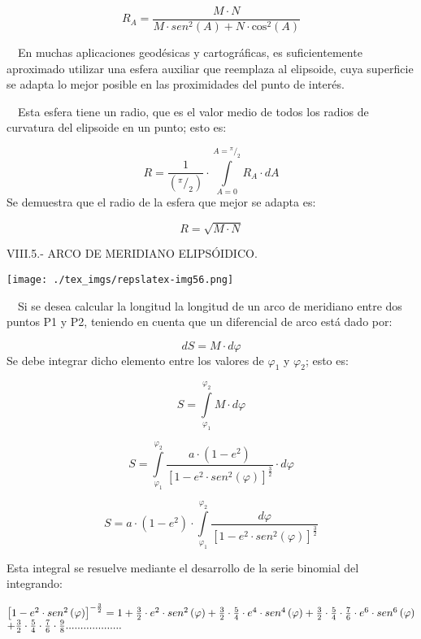 \documentclass[]{article}
\begin{document}
\[{R_{{A}}=\frac{M\cdot N}{M\cdot sen^{{2}}\left(A\right)+N\cdot \text{cos}^{{2}}\left(A\right)}}\]

~~En muchas aplicaciones geodésicas y cartográficas, es suficientemente
aproximado utilizar una esfera auxiliar que reemplaza al elipsoide, cuya
superficie se adapta lo mejor posible en las proximidades del punto de
interés.

~~Esta esfera tiene un radio, que es el valor medio de todos los radios
de curvatura del elipsoide en un punto; esto es:

\[{R=\frac{1}{\left({}^{\pi }/_{2}\right)}\cdot \overset{{A={}^{\pi }/_{2}}}{\underset{{A=0}}{\int }}{R_{{A}}\cdot dA}}\]
Se demuestra que el radio de la esfera que mejor se adapta es:

\[{R=\sqrt{M\cdot N}}\]

VIII.5.- ARCO DE MERIDIANO ELIPSÓIDICO.

\texttt{[image: ./tex\_imgs/repslatex-img56.png]}

~~Si se desea calcular la longitud la longitud de un arco de meridiano
entre dos puntos P1 y P2, teniendo en cuenta que un diferencial de arco
está dado por:

\[{dS=M\cdot d\varphi }\] Se debe integrar dicho elemento entre los
valores de \({\varphi _{{1}}}\) y \({\varphi _{{2}}}\); esto es:

\[{S=\overset{\varphi _{{2}}}{\underset{{\varphi _{{1}}}}{\int }}{M\cdot
d\varphi }}\]

\[{S=\overset{\varphi _{{2}}}{\underset{{\varphi _{{1}}}}{\int}}{\frac{a\cdot \left(1-e^{{2}}\right)}{\left[1-e^{{2}}\cdot sen^{{2}}\left(\varphi \right)\right]^{{\frac{3}{2}}}}\cdot d\varphi }}\]

\[{S=a\cdot \left(1-e^{{2}}\right)\cdot \overset{\varphi _{{2}}}{\underset{{\varphi _{{1}}}}{\int }}{\frac{d\varphi}{\left[1-e^{{2}}\cdot sen^{{2}}\left(\varphi \right)\right]^{{\frac{3}{2}}}}}}\]

Esta integral se resuelve mediante el desarrollo de la serie binomial
del integrando:

\[\begin{matrix}{\left[1-e^{{2}}\cdot sen^{{2}}\left(\varphi \right)\right]^{{-{\frac{3}{2}}}}=1+\frac{3}{2}\cdot e^{{2}}\cdot sen^{{2}}\left(\varphi \right)+\frac{3}{2}\cdot {\frac{5}{4}}\cdot e^{{4}}\cdot sen^{{4}}\left(\varphi \right)+\frac{3}{2}\cdot {\frac{5}{4}}\cdot {\frac{7}{6}}\cdot e^{{6}}\cdot sen^{{6}}\left(\varphi \right)}\hfill\null \\+{\frac{3}{2}}\cdot {\frac{5}{4}}\cdot {\frac{7}{6}}\cdot {\frac{9}{8}}\text{.}\text{.}\text{.}\text{.}\text{.}\text{.}\text{.}\text{.}\text{.}\text{.}\text{.}\text{.}\text{.}\text{.}\text{.}\text{.}\text{.}\text{.}\text{.}\hfill\null \end{matrix}\hfill\]
\end{document}
